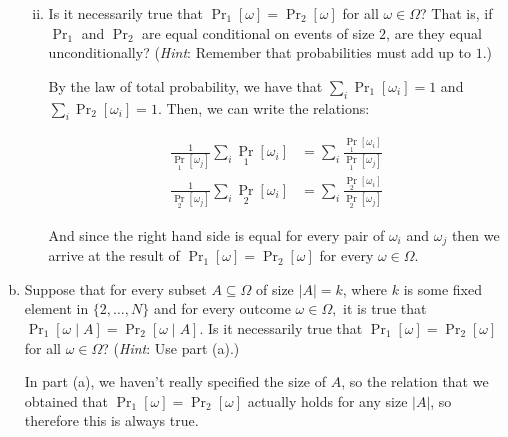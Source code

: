 \documentclass[11pt]{article}
\begin{document}
\begin{enumerate}[(a)]
\begin{enumerate}[(i)]
\begin{solution}
            \end{solution}

            \item Is it necessarily true that $\Pr_1[\omega] = \Pr_2[\omega]$ for all $\omega\in\Omega$? That is, if $\Pr_1$ and $\Pr_2$ are equal conditional on events of size $2$, are they equal unconditionally? (\emph{Hint}: Remember that probabilities must add up to $1$.)
            
            \begin{solution}
                By the law of total probability, we have that $\sum_i \Pr_1[\omega_i] = 1$ and $\sum_i \Pr_2[\omega_i] = 1$. Then, we can write the relations: 

                \begin{align*}
                    \frac{1}{\Pr_1[\omega_j]} \sum_i \Pr_1[\omega_i] &= \sum_i \frac{\Pr_1[\omega_i]}{\Pr_1[\omega_j]}\\
                    \frac{1}{\Pr_2[\omega_j]} \sum_i \Pr_2[\omega_i] &= \sum_i \frac{\Pr_2[\omega_i]}{\Pr_2[\omega_j]}
                \end{align*}

                And since the right hand side is equal for every pair of $\omega_i$ and $\omega_j$ then we arrive at the result of $\Pr_1[\omega] = \Pr_2[\omega]$ for every $\omega \in \Omega$.



            \end{solution}
        \end{enumerate}

    \item Suppose that for every subset $A\subseteq \Omega$ of size $|A| = k$, where $k$ is some fixed element in $\{2, \dots, N\}$ and for every outcome $\omega\in\Omega,$ it is true that $\Pr_1[\omega \mid A] = \Pr_2[ \omega \mid A]$. Is it necessarily true that $\Pr_1[\omega] = \Pr_2[\omega]$ for all $\omega\in\Omega$? (\emph{Hint}: Use part (a).)
    
    \begin{solution}
        In part (a), we haven't really specified the size of $A$, so the relation that we obtained that $\Pr_1[\omega] = \Pr_2[\omega]$ actually holds for any size $|A|$, so therefore this is always true.
    \end{solution}
\end{enumerate}
\end{document}
